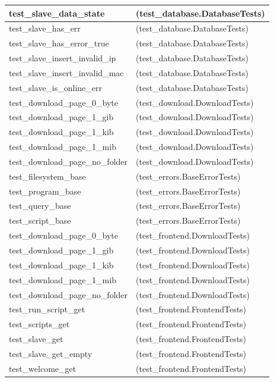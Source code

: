 \begin{longtable}{|p{10cm}|p{7cm}|}
test\_slave\_data\_state & (test\_database.DatabaseTests)\\\hline
test\_slave\_has\_err & (test\_database.DatabaseTests)\\\hline
test\_slave\_has\_error\_true & (test\_database.DatabaseTests)\\\hline
test\_slave\_insert\_invalid\_ip & (test\_database.DatabaseTests)\\\hline
test\_slave\_insert\_invalid\_mac & (test\_database.DatabaseTests)\\\hline
test\_slave\_is\_online\_err & (test\_database.DatabaseTests)\\\hline
test\_download\_page\_0\_byte & (test\_download.DownloadTests)\\\hline
test\_download\_page\_1\_gib & (test\_download.DownloadTests)\\\hline
test\_download\_page\_1\_kib & (test\_download.DownloadTests)\\\hline
test\_download\_page\_1\_mib & (test\_download.DownloadTests)\\\hline
test\_download\_page\_no\_folder & (test\_download.DownloadTests)\\\hline
test\_filesystem\_base & (test\_errors.BaseErrorTests)\\\hline
test\_program\_base & (test\_errors.BaseErrorTests)\\\hline
test\_query\_base & (test\_errors.BaseErrorTests)\\\hline
test\_script\_base & (test\_errors.BaseErrorTests)\\\hline
test\_download\_page\_0\_byte & (test\_frontend.DownloadTests)\\\hline
test\_download\_page\_1\_gib & (test\_frontend.DownloadTests)\\\hline
test\_download\_page\_1\_kib & (test\_frontend.DownloadTests)\\\hline
test\_download\_page\_1\_mib & (test\_frontend.DownloadTests)\\\hline
test\_download\_page\_no\_folder & (test\_frontend.DownloadTests)\\\hline
test\_run\_script\_get & (test\_frontend.FrontendTests)\\\hline
test\_scripts\_get & (test\_frontend.FrontendTests)\\\hline
test\_slave\_get & (test\_frontend.FrontendTests)\\\hline
test\_slave\_get\_empty & (test\_frontend.FrontendTests)\\\hline
test\_welcome\_get & (test\_frontend.FrontendTests)\\\hline

\end{longtable}
